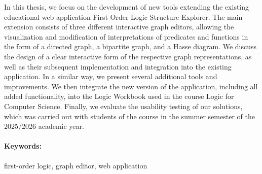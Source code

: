 \documentclass[12pt, twoside]{book}
\begin{document}
In this thesis, we focus on the development of new tools extending the existing educational web application First-Order Logic Structure Explorer.
The main extension consists of three different interactive graph editors, allowing the visualization and modification of interpretations of predicates and functions in the form of a directed graph, a bipartite graph, and a Hasse diagram. We discuss the design of a clear interactive form of the respective graph representations, as well as their subsequent implementation and integration into the existing application. In a similar way, we present several additional tools and improvements.
We then integrate the new version of the application, including all added functionality, into the Logic Workbook used in the course Logic for Computer Science. Finally, we evaluate the usability testing of our solutions, which was carried out with students of the course in the summer semester of the 2025/2026 academic year.

\paragraph*{Keywords:} first-order logic, graph editor, web application


%
%
%



\newpage

\tableofcontents





\end{document}
